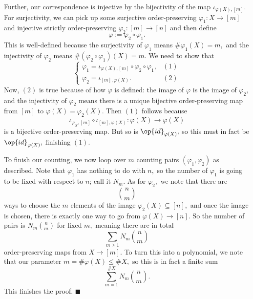 Further, our correspondence is injective by the bijectivity of the map $\iota_{\varphi(X),[m]}.$ For surjectivity, we can pick up some surjective order-preserving $\varphi_1:X\to[m]$ and injective strictly order-preserving $\varphi_2:[m]\to[n]$ and then define
\[\varphi:=\varphi_2\circ\varphi_1.\]
This is well-defined because the surjectivity of $\varphi_1$ means $\#\varphi_1(X)=m,$ and the injectivity of $\varphi_2$ means $\#(\varphi_2\circ\varphi_1)(X)=m.$ We need to show that
\[\begin{cases}
    \varphi_1=\iota_{\varphi(X),[m]}\circ\varphi_2\circ\varphi_1, & (1)\\
    \varphi_2=\iota_{[m],\varphi(X)}. & (2)
\end{cases}\]
Now, $(2)$ is true because of how $\varphi$ is defined: the image of $\varphi$ is the image of $\varphi_2,$ and the injectivity of $\varphi_2$ means there is a unique bijective order-preserving map from $[m]$ to $\varphi(X)=\varphi_2(X).$ Then $(1)$ follows because
\[\iota_{\varphi_X,[m]}\circ\iota_{[m],\varphi(X)}:\varphi(X)\to\varphi(X)\]
is a bijective order-preserving map. But so is $\op{id}_{\varphi(X)},$ so this must in fact be $\op{id}_{\varphi(X)},$ finishing $(1).$

To finish our counting, we now loop over $m$ counting pairs $(\varphi_1,\varphi_2)$ as described. Note that $\varphi_1$ has nothing to do with $n,$ so the number of $\varphi_1$ is going to be fixed with respect to $n$; call it $N_m.$ As for $\varphi_2,$ we note that there are
\[\binom nm\]
ways to choose the $m$ elements of the image $\varphi_2(X)\subseteq[n],$ and once the image is chosen, there is exactly one way to go from $\varphi(X)\to[n].$ So the number of pairs is $N_m\binom nm$ for fixed $m,$ meaning there are in total
\[\sum_{m\ge1}N_m\binom nm\]
order-preserving maps from $X\to[m].$ To turn this into a polynomial, we note that our parameter $m=\#\varphi(X)\le\#X,$ so this is in fact a finite sum
\[\sum_{m=1}^{\#X}N_m\binom nm.\]
This finishes the proof. $\blacksquare$

